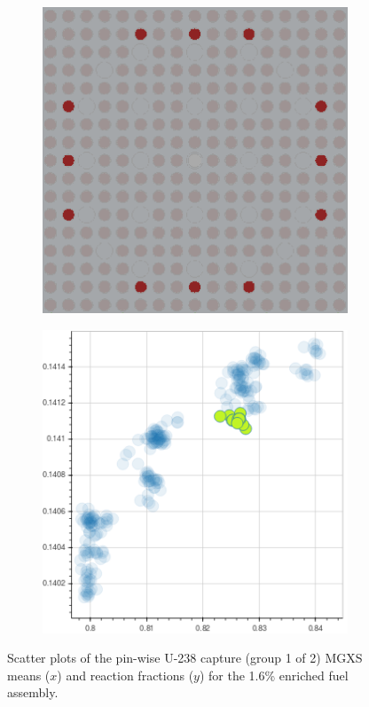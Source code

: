 \begin{figure}[h!]
\begin{subfigure}{0.45\textwidth}
  \caption{}
  \label{fig:chap10-capt-mean-react-frac-mgxs-2}
\end{subfigure}
\begin{subfigure}{0.45\textwidth}
  \centering
  \includegraphics[width=0.9\linewidth]{figures/unsupervised/features/assm-16/u238-capt/mean-react-frac/geometry-3}
  \caption{}
  \label{fig:chap10-capt-mean-react-frac-geom-3}
\end{subfigure}%
\begin{subfigure}{0.45\textwidth}
  \centering
  \includegraphics[width=0.9\linewidth]{figures/unsupervised/features/assm-16/u238-capt/mean-react-frac/mgxs-3}
  \caption{}
  \label{fig:chap10-capt-mean-react-frac-mgxs-3}
\end{subfigure}
\caption[Clustering of U-238 capture MGXS reaction fractions]{Scatter plots of the pin-wise U-238 capture (group 1 of 2) \ac{MGXS} means ($x$) and reaction fractions ($y$) for the 1.6\% enriched fuel assembly.}
\label{fig:chap10-capt-mean-react-frac}
\end{figure}

